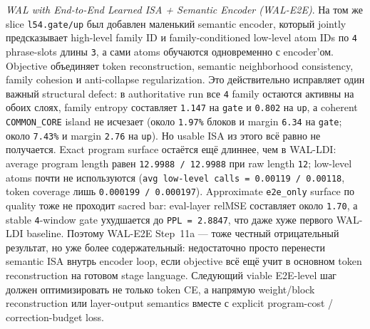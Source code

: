 \begin{itemize}[leftmargin=1.5em]
\emph{WAL with End-to-End Learned ISA + Semantic Encoder (WAL-E2E)}.
На том же slice \texttt{l54.gate/up} был добавлен маленький semantic encoder,
который jointly предсказывает high-level family ID и family-conditioned
low-level atom IDs по \texttt{4} phrase-slots длины \texttt{3}, а сами atoms
обучаются одновременно с encoder'ом. Objective объединяет token reconstruction,
semantic neighborhood consistency, family cohesion и anti-collapse
regularization. Это действительно исправляет один важный structural defect:
в authoritative run все \texttt{4} family остаются активны на обоих слоях,
family entropy составляет \texttt{1.147} на \texttt{gate} и \texttt{0.802}
на \texttt{up}, а coherent \texttt{COMMON\_CORE} island не исчезает
(около \texttt{1.97\%} блоков и margin \texttt{6.34} на \texttt{gate};
около \texttt{7.43\%} и margin \texttt{2.76} на \texttt{up}).
Но usable ISA из этого всё равно не получается. Exact program surface остаётся
ещё длиннее, чем в WAL-LDI: average program length равен
\texttt{12.9988 / 12.9988} при raw length \texttt{12}; low-level atoms почти
не используются (\texttt{avg low-level calls = 0.00119 / 0.00118}, token
coverage лишь \texttt{0.000199 / 0.000197}). Approximate \texttt{e2e\_only}
surface по quality тоже не проходит sacred bar:
eval-layer relMSE составляет около \texttt{1.70}, а stable \texttt{4}-window
gate ухудшается до \texttt{PPL = 2.8847}, что даже хуже первого WAL-LDI
baseline. Поэтому WAL-E2E Step~11a --- тоже честный отрицательный результат,
но уже более содержательный: недостаточно просто перенести semantic ISA внутрь
encoder loop, если objective всё ещё учит в основном token reconstruction на
готовом stage language. Следующий viable E2E-level шаг должен оптимизировать
не только token CE, а напрямую weight/block reconstruction или layer-output
semantics вместе с explicit program-cost / correction-budget loss.


\end{itemize}

